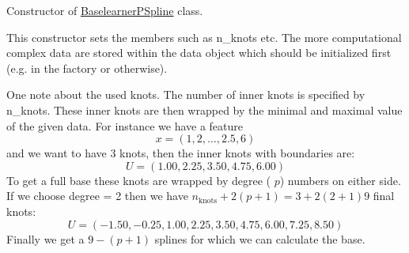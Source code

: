 Constructor of {\ttfamily \mbox{\hyperlink{classblearner_1_1_baselearner_p_spline}{Baselearner\+P\+Spline}}} class.

This constructor sets the members such as n\+\_\+knots etc. The more computational complex data are stored within the data object which should be initialized first (e.\+g. in the factory or otherwise).

One note about the used knots. The number of inner knots is specified by {\ttfamily n\+\_\+knots}. These inner knots are then wrapped by the minimal and maximal value of the given data. For instance we have a feature \[ x = (1, 2, \dots, 2.5, 6) \] and we want to have 3 knots, then the inner knots with boundaries are\+: \[ U = (1.00, 2.25, 3.50, 4.75, 6.00) \] To get a full base these knots are wrapped by {\ttfamily degree} ( $p$) numbers on either side. If we choose {\ttfamily degree = 2} then we have $n_\mathrm{knots} + 2(p + 1) = 3 + 2(2 + 1) 9$ final knots\+: \[ U = (-1.50, -0.25, 1.00, 2.25, 3.50, 4.75, 6.00, 7.25, 8.50) \] Finally we get a $9 - (p + 1)$ splines for which we can calculate the base. ~\newline
 
